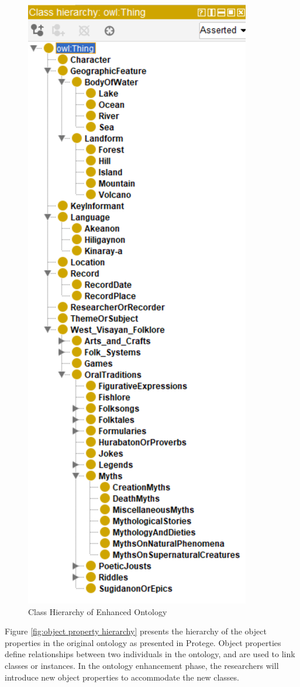 \begin{figure}[H]
    \centering
    \includegraphics[width=0.5\linewidth]{figures/Class Hierarchy of Enhanced Ontology.png}
    \caption{Class Hierarchy of Enhanced Ontology}
    \label{fig:class hierarchy enhanced}
\end{figure}

Figure \ref{fig:object property hierarchy} presents the hierarchy of the object properties in the original ontology as presented in Protege. Object properties define relationships between two individuals in the ontology, and are used to link classes or instances. In the ontology enhancement phase, the researchers will introduce new object properties to accommodate the new classes.

